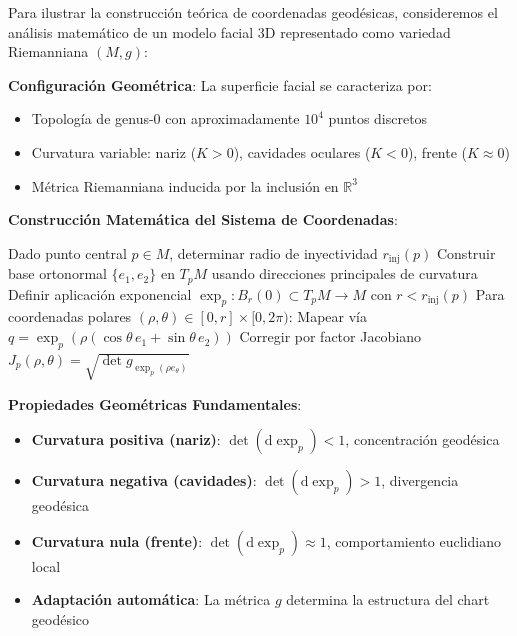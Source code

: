 \begin{example}
Para ilustrar la construcción teórica de coordenadas geodésicas, consideremos el análisis matemático de un modelo facial 3D representado como variedad Riemanniana $(M, g)$:

\textbf{Configuración Geométrica}:
La superficie facial se caracteriza por:
\begin{itemize}
    \item Topología de genus-0 con aproximadamente $10^4$ puntos discretos
    \item Curvatura variable: nariz ($K > 0$), cavidades oculares ($K < 0$), frente ($K \approx 0$)
    \item Métrica Riemanniana inducida por la inclusión en $\mathbb{R}^3$
\end{itemize}

\textbf{Construcción Matemática del Sistema de Coordenadas}:

\begin{algorithm}[H]
\caption{Construcción Rigurosa de Charts Geodésicos}
\begin{algorithmic}[1]
    \State Dado punto central $p \in M$, determinar radio de inyectividad $r_{\text{inj}}(p)$
    \State Construir base ortonormal $\{e_1, e_2\}$ en $T_p M$ usando direcciones principales de curvatura
    \State Definir aplicación exponencial $\exp_p: B_r(0) \subset T_p M \to M$ con $r < r_{\text{inj}}(p)$
    \State Para coordenadas polares $(\rho, \theta) \in [0,r] \times [0,2\pi)$:
    \State \quad Mapear vía $q = \exp_p(\rho(\cos\theta \, e_1 + \sin\theta \, e_2))$
    \State Corregir por factor Jacobiano $J_p(\rho,\theta) = \sqrt{\det g_{\exp_p(\rho e_\theta)}}$
\end{algorithmic}
\end{algorithm}

\textbf{Propiedades Geométricas Fundamentales}:
\begin{itemize}
    \item \textbf{Curvatura positiva (nariz)}: $\det(\text{d}\exp_p) < 1$, concentración geodésica
    \item \textbf{Curvatura negativa (cavidades)}: $\det(\text{d}\exp_p) > 1$, divergencia geodésica
    \item \textbf{Curvatura nula (frente)}: $\det(\text{d}\exp_p) \approx 1$, comportamiento euclidiano local
    \item \textbf{Adaptación automática}: La métrica $g$ determina la estructura del chart geodésico
\end{itemize}
\end{example}

